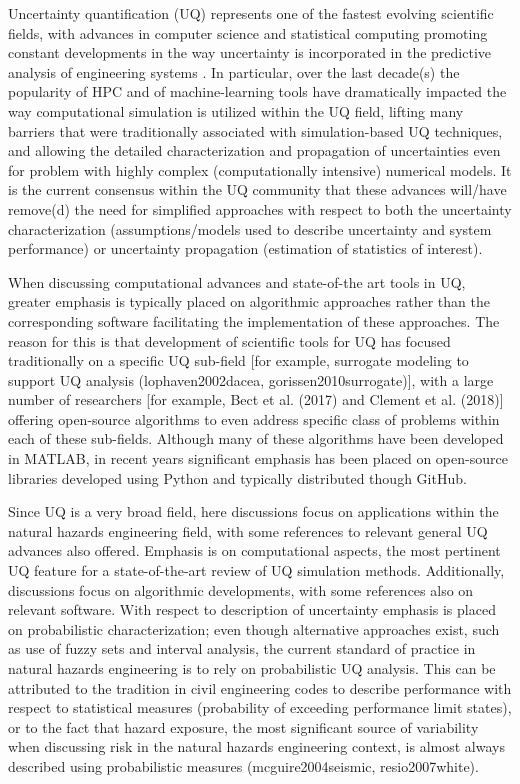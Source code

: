 Uncertainty quantification (UQ) represents one of the fastest evolving scientific fields, with advances in computer science and statistical computing promoting constant developments in the way uncertainty is incorporated in the predictive analysis of engineering systems \citep{smith2013uncertainty}. In particular, over the last decade(s) the popularity of HPC and of machine-learning tools have dramatically impacted the way computational simulation is utilized within the UQ field, lifting many barriers that were traditionally associated with simulation-based UQ techniques, and allowing the detailed characterization and propagation of uncertainties even for problem with highly complex (computationally intensive) numerical models. It is the current consensus within the UQ community that these advances will/have remove(d) the need for simplified approaches with respect to both the uncertainty characterization (assumptions/models used to describe uncertainty and system performance) or uncertainty propagation (estimation of statistics of interest). 

When discussing computational advances and state-of-the art tools in UQ, greater emphasis is typically placed on algorithmic approaches rather than the corresponding software facilitating the implementation of these approaches. The reason for this is that development of scientific tools for UQ has focused traditionally on a specific UQ sub-field [for example, surrogate modeling to support UQ analysis (lophaven2002dacea, gorissen2010surrogate)], with a large number of researchers [for example, Bect et al. (2017) and Clement et al. (2018)] offering open-source algorithms to even address specific class of problems within each of these sub-fields. Although many of these algorithms have been developed in MATLAB, in recent years significant emphasis has been placed on open-source libraries developed using Python and typically distributed though GitHub. 

Since UQ is a very broad field, here discussions focus on applications within the natural hazards engineering field, with some references to relevant general UQ advances also offered. Emphasis is on computational aspects, the most pertinent UQ feature for a state-of-the-art review of UQ simulation methods. Additionally, discussions focus on algorithmic developments, with some references also on relevant software. With respect to description of uncertainty emphasis is placed on probabilistic characterization; even though alternative approaches exist, such as use of fuzzy sets and interval analysis, the current standard of practice in natural hazards engineering is to rely on probabilistic UQ analysis. This can be attributed to the tradition in civil engineering codes to describe performance with respect to statistical measures (probability of exceeding performance limit states), or to the fact that hazard exposure, the most significant source of variability when discussing risk in the natural hazards engineering context, is almost always described using probabilistic measures (mcguire2004seismic, resio2007white). 

